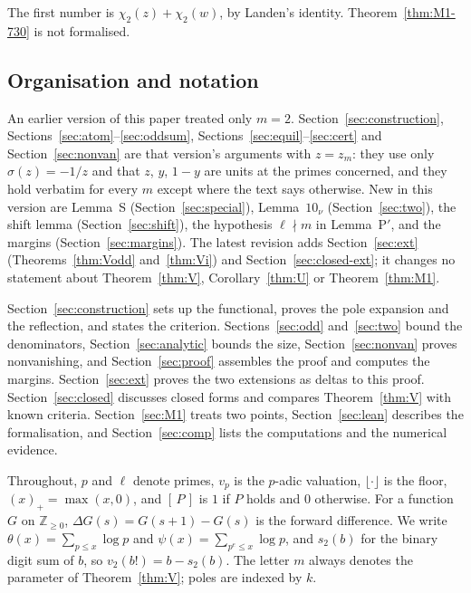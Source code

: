 \documentclass[11pt]{amsart}
\theoremstyle{definition}
\theoremstyle{remark}
\numberwithin{equation}{section}
\newcommand{\ZZ}{\mathbb{Z}}
\newcommand{\ind}[1]{[\,#1\,]}
\begin{document}
The first number is $\chi_2(z)+\chi_2(w)$, by Landen's identity. Theorem~\ref{thm:M1-730} is not formalised.

\subsection{Organisation and notation}
An earlier version of this paper treated only $m=2$. Section~\ref{sec:construction}, Sections~\ref{sec:atom}--\ref{sec:oddsum},
Sections~\ref{sec:equil}--\ref{sec:cert} and Section~\ref{sec:nonvan} are that version's arguments with $z=z_m$: they use
only $\sigma(z)=-1/z$ and that $z$, $y$, $1-y$ are units at the primes concerned, and they hold verbatim for every $m$
except where the text says otherwise. New in this version are Lemma~S (Section~\ref{sec:special}), Lemma~$10_\nu$
(Section~\ref{sec:two}), the shift lemma (Section~\ref{sec:shift}), the hypothesis $\ell\nmid m$ in Lemma~P$'$, and the
margins (Section~\ref{sec:margins}). The latest revision adds Section~\ref{sec:ext} (Theorems~\ref{thm:Vodd}
and~\ref{thm:Vi}) and Section~\ref{sec:closed-ext}; it changes no statement about Theorem~\ref{thm:V},
Corollary~\ref{thm:U} or Theorem~\ref{thm:M1}.

Section~\ref{sec:construction} sets up the functional, proves the pole expansion and the reflection, and states the
criterion. Sections~\ref{sec:odd} and~\ref{sec:two} bound the denominators, Section~\ref{sec:analytic} bounds the size,
Section~\ref{sec:nonvan} proves nonvanishing, and Section~\ref{sec:proof} assembles the proof and computes the margins.
Section~\ref{sec:ext} proves the two extensions as deltas to this proof. Section~\ref{sec:closed} discusses closed forms and compares Theorem~\ref{thm:V} with known criteria.
Section~\ref{sec:M1} treats two points, Section~\ref{sec:lean} describes the formalisation, and Section~\ref{sec:comp}
lists the computations and the numerical evidence.

Throughout, $p$ and $\ell$ denote primes, $v_p$ is the $p$-adic valuation, $\lfloor\cdot\rfloor$ is the floor,
$(x)_+=\max(x,0)$, and $\ind{P}$ is $1$ if $P$ holds and $0$ otherwise. For a function $G$ on $\ZZ_{\ge0}$,
$\Delta G(s)=G(s+1)-G(s)$ is the forward difference. We write $\theta(x)=\sum_{p\le x}\log p$ and
$\psi(x)=\sum_{p^e\le x}\log p$, and $s_2(b)$ for the binary digit sum of $b$, so $v_2(b!)=b-s_2(b)$. The letter $m$
always denotes the parameter of Theorem~\ref{thm:V}; poles are indexed by $k$.

\end{document}
